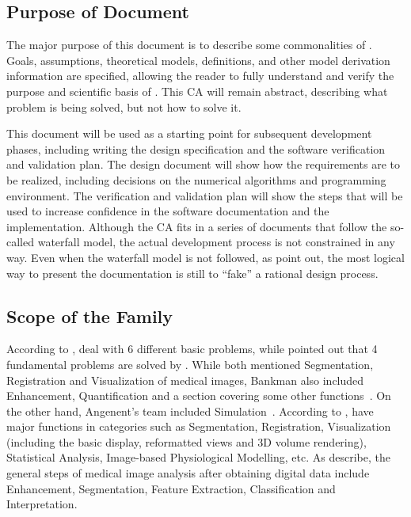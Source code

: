 \documentclass[12pt]{article}
\begin{document}
\subsection{Purpose of Document}

The major purpose of this document is to describe some commonalities of \famname. Goals, assumptions, theoretical models, definitions, and other model derivation information are specified, allowing the reader to fully understand and verify the purpose and scientific basis of \famname. This CA will remain abstract, describing what problem is being solved, but not how to solve it.

This document will be used as a starting point for subsequent development phases, including writing the design specification and the software verification and validation plan. The design document will show how the requirements are to be realized, including decisions
on the numerical algorithms and programming environment. The verification and validation plan will show the steps that will be used to increase confidence in the software documentation and the implementation. Although the CA fits in a series of documents that follow the so-called waterfall model, the actual development process is not constrained in any way. Even when the waterfall model is not followed, as \cite{ParnasAndClements1986} point out, the most logical way to present the documentation is still to “fake” a rational design process.

\subsection{Scope of the Family} 

According to \cite{Bankman2000}, \famname{} deal with 6 different basic problems, while \cite{Angenent2006} pointed out that 4 fundamental problems are solved by \famname. While both mentioned Segmentation, Registration and Visualization of medical images, Bankman also included Enhancement, Quantification and a section covering some other functions~\cite{Bankman2000}. On the other hand, Angenent's team included Simulation~\cite{Angenent2006}. According to \cite{wiki:001}, \famname{} have major functions in categories such as Segmentation, Registration, Visualization (including the basic display, reformatted views and 3D volume rendering), Statistical Analysis, Image-based Physiological Modelling, etc. As \cite{Kim2011} describe, the general steps of medical image analysis after obtaining digital data include Enhancement, Segmentation, Feature Extraction, Classification and Interpretation.
\end{document}
